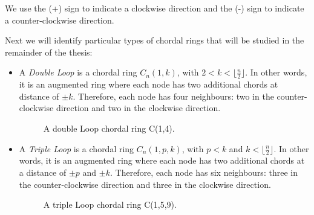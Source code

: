 We use the (+) sign to indicate a clockwise direction and the (-) sign to indicate a counter-clockwise direction.


Next we will identify particular types of chordal rings that will be studied in the remainder of the thesis:

\begin{itemize}


\item  A {\em Double Loop} is a chordal ring $C_n(1,k)$, with  $2<k<\lfloor\frac{n}{2}\rfloor$. In other words, it is an augmented ring where each node has two additional chords at distance of $\pm k$.
  Therefore, each node has four neighbours: two in the counter-clockwise direction and two in the clockwise direction. 

 


\begin{figure}[H]
  \centering
  \caption{A double Loop chordal ring C(1,4).}
\end{figure}
\item A {\em Triple Loop}   is a chordal ring  $C_n(1,p, k)$, with    $p<k$  and $k<\lfloor\frac{n}{2}\rfloor$. In other words, it is an augmented ring where each node has two additional chords at a distance of $\pm p$ and $\pm k$.
Therefore, each node has six neighbours: three in the counter-clockwise direction and three in the clockwise direction. 
\begin{figure}[H]
  \centering
  \caption{A triple Loop chordal ring C(1,5,9).}
\end{figure}


\end{itemize}
